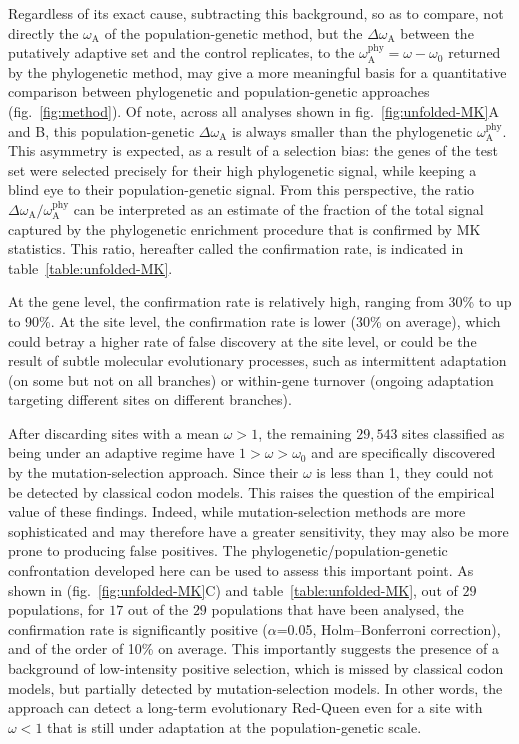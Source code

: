 \documentclass{article}
\newcommand{\rateApop}{\omega_{\mathrm{A}}}
\newcommand{\rateAphy}{\rateApop^{\mathrm{phy}}}
\begin{document}
    Regardless of its exact cause, subtracting this background, so as to compare, not directly the $\rateApop$ of the population-genetic method, but the $\Delta \rateApop$ between the putatively adaptive set and the control replicates, to the $\rateAphy= \omega - \omega_0$ returned by the phylogenetic method, may give a more meaningful basis for a quantitative comparison between phylogenetic and population-genetic approaches (fig.~\ref{fig:method}).
    Of note, across all analyses shown in fig.~\ref{fig:unfolded-MK}A and B, this population-genetic $\Delta \rateApop$ is always smaller than the phylogenetic $\rateAphy$.
    This asymmetry is expected, as a result of a selection bias: the genes of the test set were selected precisely for their high phylogenetic signal, while keeping a blind eye to their population-genetic signal.
    From this perspective, the ratio $\Delta \rateApop /  \rateAphy$ can be interpreted as an estimate of the fraction of the total signal captured by the phylogenetic enrichment procedure that is confirmed by MK statistics.
    This ratio, hereafter called the confirmation rate, is indicated in table~\ref{table:unfolded-MK}.

    At the gene level, the confirmation rate is relatively high, ranging from 30\% to up to 90\%.
    At the site level, the confirmation rate is lower (30\% on average), which could betray a higher rate of false discovery at the site level, or could be the result of subtle molecular evolutionary processes, such as intermittent adaptation (on some but not on all branches) or within-gene turnover (ongoing adaptation targeting different sites on different branches).

    After discarding sites with a mean $\omega > 1$, the remaining $29,543$ sites classified as being under an adaptive regime have $1 > \omega > \omega_{0}$ and are specifically discovered by the mutation-selection approach.
    Since their $\omega$ is less than 1, they could not be detected by classical codon models.
    This raises the question of the empirical value of these findings.
    Indeed, while mutation-selection methods are more sophisticated and may therefore have a greater sensitivity, they may also be more prone to producing false positives.
    The phylogenetic/population-genetic confrontation developed here can be used to assess this important point.
    As shown in (fig.~\ref{fig:unfolded-MK}C) and table~\ref{table:unfolded-MK}, out of $29$ populations, for $17$ out of the $29$ populations that have been analysed, the confirmation rate is significantly positive ($\alpha$=0.05, Holm–Bonferroni correction), and of the order of 10\% on average.
    This importantly suggests the presence of a background of low-intensity positive selection, which is missed by classical codon models, but partially detected by mutation-selection models.
    In other words, the approach can detect a long-term evolutionary Red-Queen even for a site with $\omega < 1$ that is still under adaptation at the population-genetic scale.
\end{document}
